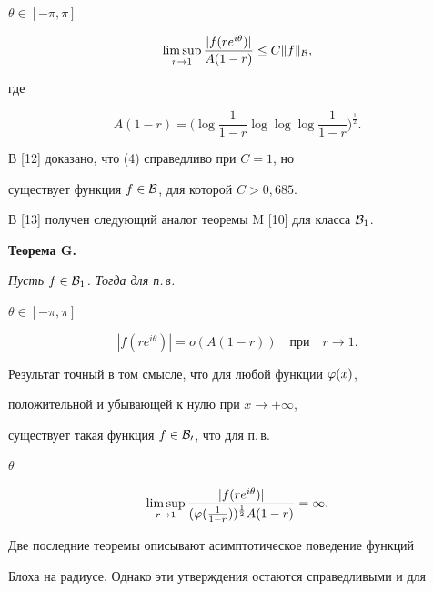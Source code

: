 $\theta\in[-\pi, \pi]$


\begin{equation}


\limsup_{r\to 1}\frac{|f(re^{i\theta})|}{A(1-r)}


\leq C\|f\|_{\Bl},


\end{equation}


где


$$


A(1-r)=\bigg(\log\frac 1{1-r}\log\log\log\frac 1{1-r}\bigg)^{\frac 12}.


$$


\smallskip





В [12] доказано, что (4) справедливо при $C=1$, но


существует функция $f\in{\cal B}$, для которой $C>0{,}685$.


В [13] получен следующий аналог теоремы M [10] для класса ${\cal B}_1$.


\smallskip





{\bf Теорема G.} {\it Пусть $f\in{\cal B}_1$. Тогда для п.\,в.


$\theta\in[-\pi,\pi]$


\begin{equation}


|f(re^{i\theta})|=o(A(1-r))


\quad \text{при} \quad r\to 1.


\end{equation}


Результат точный в том смысле, что для любой функции $\varphi(x)$,


положительной и убывающей к нулю при $x\to+\infty$,


существует такая функция $f\in{\cal B_0}$, что для п.\,в.} $\theta$


\begin{equation}


\limsup_{r\to 1}\frac{|f(re^{i\theta})|}{


(\p(\frac 1{1-r}))^{\frac 12}A(1-r)}=\infty.


\end{equation}





Две последние теоремы описывают асимптотическое поведение функций


Блоха на радиусе. Однако эти утверждения остаются справедливыми и для


